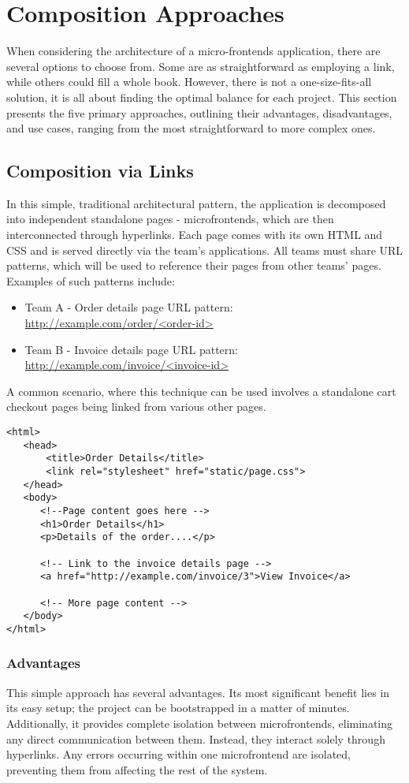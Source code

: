 \section{Composition Approaches}
When considering the architecture of a micro-frontends application, there are several options to choose from. Some are as straightforward as employing a link, while others could fill a whole book. However, there is not a one-size-fits-all solution, it is all about finding the optimal balance for each project. This section presents the five primary approaches, outlining their advantages, disadvantages, and use cases, ranging from the most straightforward to more complex ones.

\subsection{Composition via Links}
In this simple, traditional architectural pattern, the application is decomposed into independent standalone pages - microfrontends, which are then interconnected through hyperlinks. Each page comes with its own HTML and CSS and is served directly via the team's applications. All teams must share URL patterns, which will be used to reference their pages from other teams' pages. Examples of such patterns include:
\begin{itemize}
   \item Team A - Order details page \newline
   URL pattern: \url{http://example.com/order/<order-id>}
   \item Team B - Invoice details page \newline
   URL pattern: \url{http://example.com/invoice/<invoice-id>}
   \end{itemize}
A common scenario, where this technique can be used involves a standalone cart checkout pages being linked from various other pages.
\begin{verbatim}
<html>
   <head>
       <title>Order Details</title>
       <link rel="stylesheet" href="static/page.css">
   </head>
   <body>
      <!--Page content goes here -->
      <h1>Order Details</h1>
      <p>Details of the order....</p>
       
      <!-- Link to the invoice details page -->
      <a href="http://example.com/invoice/3">View Invoice</a>
       
      <!-- More page content -->
   </body>
</html>
\end{verbatim}

\subsubsection{Advantages}
This simple approach has several advantages. Its most significant benefit lies in its easy setup; the project can be bootstrapped in a matter of minutes. Additionally, it provides complete isolation between microfrontends, eliminating any direct communication between them. Instead, they interact solely through hyperlinks. Any errors occurring within one microfrontend are isolated, preventing them from affecting the rest of the system.


